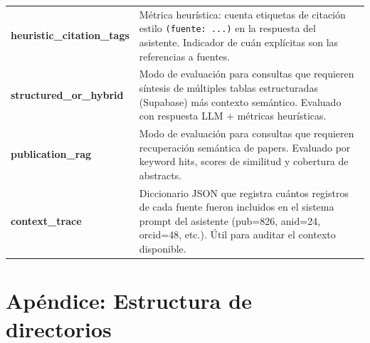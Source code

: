 \documentclass[12pt,a4paper]{report}
\begin{document}
\begin{longtable}{L{4cm} L{10cm}}
  \textbf{heuristic\_citation\_tags} & Métrica heurística: cuenta etiquetas de citación estilo \texttt{(fuente: ...)} en la respuesta del asistente. Indicador de cuán explícitas son las referencias a fuentes. \\
  \textbf{structured\_or\_hybrid} & Modo de evaluación para consultas que requieren síntesis de múltiples tablas estructuradas (Supabase) más contexto semántico. Evaluado con respuesta LLM + métricas heurísticas. \\
  \textbf{publication\_rag} & Modo de evaluación para consultas que requieren recuperación semántica de papers. Evaluado por keyword hits, scores de similitud y cobertura de abstracts. \\
  \textbf{context\_trace} & Diccionario JSON que registra cuántos registros de cada fuente fueron incluidos en el sistema prompt del asistente (pub=826, anid=24, orcid=48, etc.). Útil para auditar el contexto disponible. \\
  \bottomrule
\end{longtable}

\chapter*{Apéndice: Estructura de directorios}
\end{document}
